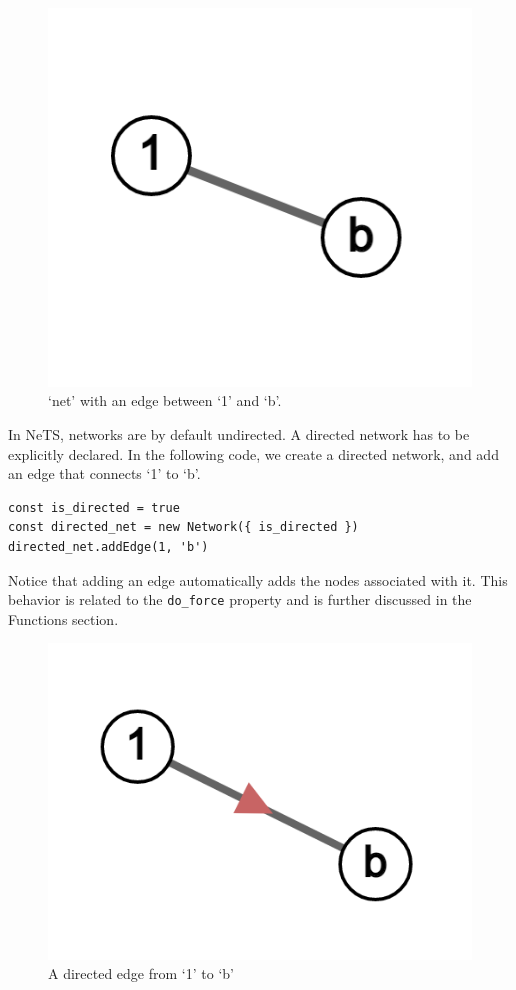 \begin{figure}[H]
  \centering
  \includegraphics[scale=.25]{img/ex_net_1b.png}
  \caption{`net' with an edge between `1' and `b'.}
  \label{fig:net_1b}
\end{figure}

In NeTS, networks are by default undirected.
A directed network has to be explicitly declared.
In the following code, we create a directed network,
and add an edge that connects `1' to `b'.

\begin{verbatim}
const is_directed = true
const directed_net = new Network({ is_directed })
directed_net.addEdge(1, 'b')
\end{verbatim}

Notice that adding an edge automatically adds the nodes associated with it.
This behavior is related to the \texttt{do_force} property and
is further discussed in the Functions section.

\begin{figure}[H]
  \centering
  \includegraphics[scale=.25]{img/ex_net_1b_dir.png}
  \caption{A directed edge from `1' to `b'}
  \label{fig:net_1b_dir}
\end{figure}


